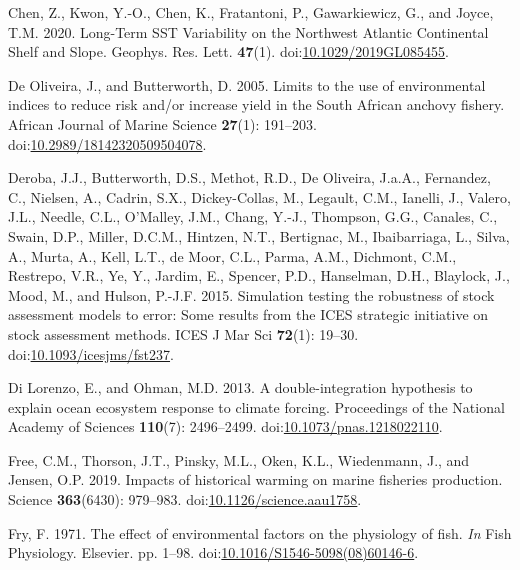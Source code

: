 \documentclass[]{article}
\begin{document}
\leavevmode\hypertarget{ref-chen2020Long}{}%
Chen, Z., Kwon, Y.-O., Chen, K., Fratantoni, P., Gawarkiewicz, G., and
Joyce, T.M. 2020. Long-Term SST Variability on the Northwest Atlantic
Continental Shelf and Slope. Geophys. Res. Lett. \textbf{47}(1).
doi:\href{https://doi.org/10.1029/2019GL085455}{10.1029/2019GL085455}.

\leavevmode\hypertarget{ref-deoliveira2005Limits}{}%
De Oliveira, J., and Butterworth, D. 2005. Limits to the use of
environmental indices to reduce risk and/or increase yield in the South
African anchovy fishery. African Journal of Marine Science
\textbf{27}(1): 191--203.
doi:\href{https://doi.org/10.2989/18142320509504078}{10.2989/18142320509504078}.

\leavevmode\hypertarget{ref-deroba2015Simulation}{}%
Deroba, J.J., Butterworth, D.S., Methot, R.D., De Oliveira, J.a.A.,
Fernandez, C., Nielsen, A., Cadrin, S.X., Dickey-Collas, M., Legault,
C.M., Ianelli, J., Valero, J.L., Needle, C.L., O'Malley, J.M., Chang,
Y.-J., Thompson, G.G., Canales, C., Swain, D.P., Miller, D.C.M.,
Hintzen, N.T., Bertignac, M., Ibaibarriaga, L., Silva, A., Murta, A.,
Kell, L.T., de Moor, C.L., Parma, A.M., Dichmont, C.M., Restrepo, V.R.,
Ye, Y., Jardim, E., Spencer, P.D., Hanselman, D.H., Blaylock, J., Mood,
M., and Hulson, P.-J.F. 2015. Simulation testing the robustness of stock
assessment models to error: Some results from the ICES strategic
initiative on stock assessment methods. ICES J Mar Sci \textbf{72}(1):
19--30.
doi:\href{https://doi.org/10.1093/icesjms/fst237}{10.1093/icesjms/fst237}.

\leavevmode\hypertarget{ref-dilorenzo2013Doubleintegration}{}%
Di Lorenzo, E., and Ohman, M.D. 2013. A double-integration hypothesis to
explain ocean ecosystem response to climate forcing. Proceedings of the
National Academy of Sciences \textbf{110}(7): 2496--2499.
doi:\href{https://doi.org/10.1073/pnas.1218022110}{10.1073/pnas.1218022110}.

\leavevmode\hypertarget{ref-free2019Impacts}{}%
Free, C.M., Thorson, J.T., Pinsky, M.L., Oken, K.L., Wiedenmann, J., and
Jensen, O.P. 2019. Impacts of historical warming on marine fisheries
production. Science \textbf{363}(6430): 979--983.
doi:\href{https://doi.org/10.1126/science.aau1758}{10.1126/science.aau1758}.

\leavevmode\hypertarget{ref-fry1971Effect}{}%
Fry, F. 1971. The effect of environmental factors on the physiology of
fish. \emph{In} Fish Physiology. Elsevier. pp. 1--98.
doi:\href{https://doi.org/10.1016/S1546-5098(08)60146-6}{10.1016/S1546-5098(08)60146-6}.
\end{document}
